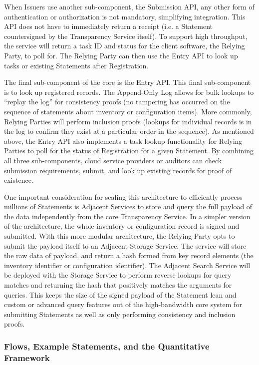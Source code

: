 \documentclass{jdf}
\begin{document}
When Issuers use another sub-component, the Submission API, any other form of authentication or authorization is not mandatory, simplifying integration. This API does not have to immediately return a receipt (i.e. a Statement countersigned by the Transparency Service itself). To support high throughput, the service will return a task ID and status for the client software, the Relying Party, to poll for. The Relying Party can then use the Entry API to look up tasks or existing Statements after Registration. 

The final sub-component of the core is the Entry API. This final sub-component is to look up registered records. The Append-Only Log allows for bulk lookups to ``replay the log'' for consistency proofs (no tampering has occurred on the sequence of statements about inventory or configuration items). More commonly, Relying Parties will perform inclusion proofs (lookups for individual records is in the log to confirm they exist at a particular order in the sequence). As mentioned above, the Entry API also implements a task lookup functionality for Relying Parties to poll for the status of Registration for a given Statement. By combining all three sub-components, cloud service providers or auditors can check submission requirements, submit, and look up existing records for proof of existence.

One important consideration for scaling this architecture to efficiently process millions of Statements is Adjacent Services to store and query the full payload of the data independently from the core Transparency Service. In a simpler version of the architecture, the whole inventory or configuration record is signed and submitted. With this more modular architecture, the Relying Party opts to submit the payload itself to an Adjacent Storage Service. The service will store the raw data of payload, and return a hash formed from key record elements (the inventory identifier or configuration identifier). The Adjacent Search Service will be deployed with the Storage Service to perform reverse lookups for query matches and returning the hash that positively matches the arguments for queries. This keeps the size of the signed payload of the Statement lean and custom or advanced query features out of the high-bandwidth core system for submitting Statements as well as only performing consistency and inclusion proofs.

\subsubsection{Flows, Example Statements, and the Quantitative Framework}
\end{document}
